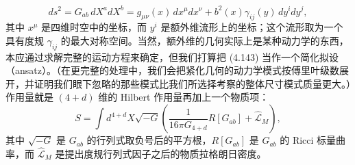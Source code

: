 \begin{equation*}
ds^{2} = G_{ab}\,dX^{a}dX^{b} = g_{\mu\nu}(x)\,dx^{\mu}dx^{\nu} + b^{2}(x)\gamma_{ij}(y)\,dy^{i}dy^{j},
\tag{4.143}
\end{equation*}
其中 $x^{\mu}$ 是四维时空中的坐标，而 $y^{i}$ 是额外维流形上的坐标；这个流形取为一个具有度规 $\gamma_{ij}$ 的最大对称空间。当然，额外维的几何实际上是某种动力学的东西，本应通过求解完整的运动方程来确定，但我们打算把 (4.143) 当作一个简化拟设（ansatz）。（在更完整的处理中，我们会把紧化几何的动力学模式按傅里叶级数展开，并证明我们眼下忽略的那些模式比我们所选择考察的整体尺寸模式质量更大。）作用量就是 $(4+d)$ 维的 Hilbert 作用量再加上一个物质项：
\begin{equation*}
S = \int d^{4+d}X\sqrt{-G}\left(\frac{1}{16\pi G_{4+d}}R[G_{ab}] + \widehat{\mathcal{L}}_M\right),
\tag{4.144}
\end{equation*}
其中 $\sqrt{-G}$ 是 $G_{ab}$ 的行列式取负号后的平方根，$R[G_{ab}]$ 是 $G_{ab}$ 的 Ricci 标量曲率，而 $\widehat{\mathcal{L}}_M$ 是提出度规行列式因子之后的物质拉格朗日密度。


